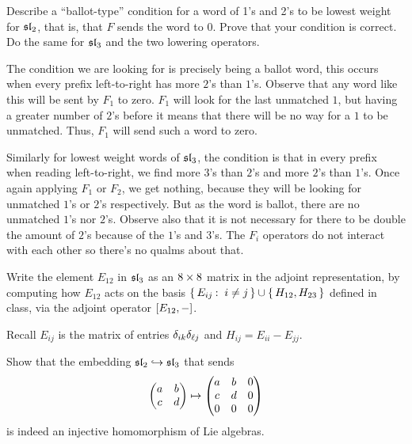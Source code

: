 \documentclass[12pt]{memoir}
\begin{document}
\begin{Ej}
    Describe a ``ballot-type'' condition for a word of 1's and 2's to be lowest weight for $\mathfrak{sl}_2$, that is, that $F$ sends the word to $0$. Prove that your condition is correct. Do the same for $\mathfrak{sl}_3$ and the two lowering operators.
\end{Ej}

\begin{ptcbr}
   The condition we are looking for is precisely being a ballot word, this occurs when every prefix left-to-right has more $2$'s than $1$'s. Observe that any word like this will be sent by $F_1$ to zero. $F_1$ will look for the last unmatched $1$, but having a greater number of $2$'s before it means that there will be no way for a $1$ to be unmatched. Thus, $F_1$ will send such a word to zero.\par
   Similarly for lowest weight words of $\mathfrak{sl}_3$, the condition is that in every prefix when reading left-to-right, we find more $3$'s than $2$'s and more $2$'s than $1$'s. Once again applying $F_1$ or $F_2$, we get nothing, because they will be looking for unmatched $1$'s or $2$'s respectively. But as the word is ballot, there are no unmatched $1$'s nor $2$'s. Observe also that it is not necessary for there to be double the amount of $2$'s because of the $1$'s and $3$'s. The $F_i$ operators do not interact with each other so there's no qualms about that.
\end{ptcbr}

\begin{Ej}
    Write the element $E_{12}$ in $\mathfrak{sl}_3$ as an $8\times 8$ matrix in the adjoint representation, by computing
how $E_{12}$ acts on the basis $\{\,E_{ij}\mathbin{:}\ i\neq j\,\} \cup\{\,H_{12}, H_{23}\,\}$ defined in class, via the adjoint operator $\left\lbrack E_{12},-\right\rbrack$.
\end{Ej}

\begin{ptcbr}
    Recall $E_{ij}$ is the matrix of entries $\delta_{ik}\delta_{\ell j}$ and $H_{ij}=E_{ii}-E_{jj}$.
\end{ptcbr}

\begin{Ej}
    Show that the embedding $\mathfrak{sl}_2\hookrightarrow\mathfrak{sl}_3$ that sends 
    $$\begin{pmatrix} a & b \\ c & d \end{pmatrix}\mapsto\begin{pmatrix} a & b & 0 \\ c & d & 0 \\ 0 & 0 & 0 \end{pmatrix}$$
    is indeed an injective homomorphism of Lie algebras.
\end{Ej}
\end{document}
